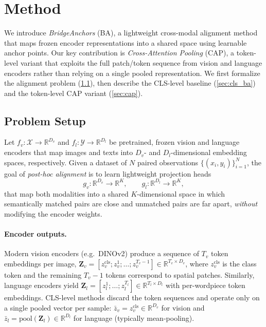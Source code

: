 
\section{Method}
\label{sec:method}

We introduce \emph{BridgeAnchors} (BA), a lightweight cross-modal alignment method that maps frozen encoder representations into a shared space using learnable anchor points.  Our key contribution is \emph{Cross-Attention Pooling} (CAP), a token-level variant that exploits the full patch/token sequence from vision and language encoders rather than relying on a single pooled representation.  We first formalize the alignment problem (\cref{sec:problem}), then describe the CLS-level baseline (\cref{sec:cls_ba}) and the token-level CAP variant (\cref{sec:cap}).

\subsection{Problem Setup}
\label{sec:problem}

Let $f_v : \mathcal{X} \to \mathbb{R}^{D_v}$ and $f_l : \mathcal{Y} \to \mathbb{R}^{D_l}$ be pretrained, frozen vision and language encoders that map images and texts into $D_v$- and $D_l$-dimensional embedding spaces, respectively.  Given a dataset of $N$ paired observations $\{(x_i, y_i)\}_{i=1}^{N}$, the goal of \emph{post-hoc alignment} is to learn lightweight projection heads
\begin{equation}
    g_v : \mathbb{R}^{D_v} \to \mathbb{R}^{K}, \qquad
    g_l : \mathbb{R}^{D_l} \to \mathbb{R}^{K},
    \label{eq:projectors}
\end{equation}
that map both modalities into a shared $K$-dimensional space in which semantically matched pairs are close and unmatched pairs are far apart, \emph{without} modifying the encoder weights.

\paragraph{Encoder outputs.}
Modern vision encoders (e.g.\ DINOv2) produce a sequence of $T_v$ token embeddings per image, $\mathbf{Z}_v = [z_v^{\mathrm{cls}}; z_v^1; \ldots; z_v^{T_v - 1}] \in \mathbb{R}^{T_v \times D_v}$, where $z_v^{\mathrm{cls}}$ is the class token and the remaining $T_v - 1$ tokens correspond to spatial patches.  Similarly, language encoders yield $\mathbf{Z}_l = [z_l^1; \ldots; z_l^{T_l}] \in \mathbb{R}^{T_l \times D_l}$ with per-wordpiece token embeddings.  CLS-level methods discard the token sequences and operate only on a single pooled vector per sample: $\bar{z}_v = z_v^{\mathrm{cls}} \in \mathbb{R}^{D_v}$ for vision and $\bar{z}_l = \mathrm{pool}(\mathbf{Z}_l) \in \mathbb{R}^{D_l}$ for language (typically mean-pooling).

